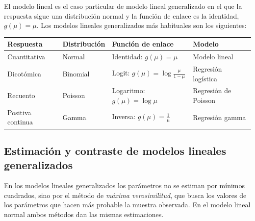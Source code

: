 \documentclass[
  spanish,
  a4paper,
]{scrreport}
\newcounter{none} %
\theoremstyle{plain}
\theoremstyle{definition}
\theoremstyle{definition}
\theoremstyle{remark}
\begin{document}
El modelo lineal es el caso particular de modelo lineal generalizado en
el que la respuesta sigue una distribución normal y la función de enlace
es la identidad, \(g(\mu)=\mu\). Los modelos lineales generalizados más
habituales son los siguientes:

{\def\LTcaptype{none} %
\begin{longtable}[]{@{}
  >{\raggedright\arraybackslash}p{}
  >{\raggedright\arraybackslash}p{}
  >{\raggedright\arraybackslash}p{}
  >{\raggedright\arraybackslash}p{}@{}}
\toprule\noalign{}
\begin{minipage}[b]{\linewidth}\raggedright
\textbf{Respuesta}
\end{minipage} & \begin{minipage}[b]{\linewidth}\raggedright
\textbf{Distribución}
\end{minipage} & \begin{minipage}[b]{\linewidth}\raggedright
\textbf{Función de enlace}
\end{minipage} & \begin{minipage}[b]{\linewidth}\raggedright
\textbf{Modelo}
\end{minipage} \\
\midrule\noalign{}
\endhead
\bottomrule\noalign{}
\endlastfoot
Cuantitativa & Normal & Identidad: \(g(\mu)=\mu\) & Modelo lineal \\
Dicotómica & Binomial & Logit: \(g(\mu)=\log\frac{\mu}{1-\mu}\) &
Regresión logística \\
Recuento & Poisson & Logaritmo: \(g(\mu)=\log\mu\) & Regresión de
Poisson \\
Positiva continua & Gamma & Inversa: \(g(\mu)=\frac{1}{\mu}\) &
Regresión gamma \\
\end{longtable}
}

\subsection{Estimación y contraste de modelos lineales
generalizados}\label{estimaciuxf3n-y-contraste-de-modelos-lineales-generalizados}

En los modelos lineales generalizados los parámetros no se estiman por
mínimos cuadrados, sino por el método de \emph{máxima verosimilitud},
que busca los valores de los parámetros que hacen más probable la
muestra observada. En el modelo lineal normal ambos métodos dan las
mismas estimaciones.
\end{document}
